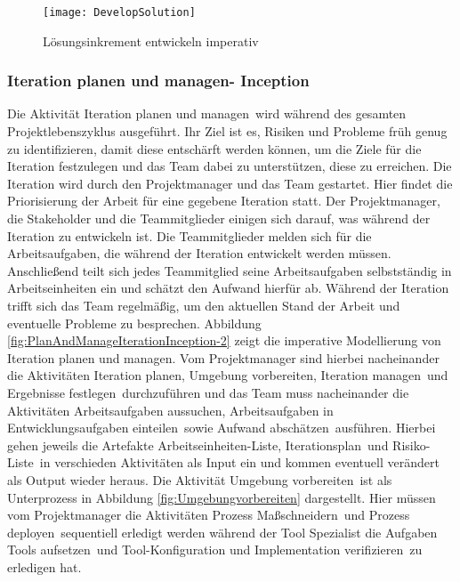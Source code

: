  
\begin{figure}[htp]
\begin{center}
  \texttt{[image: DevelopSolution]} %
  \caption{Lösungsinkrement entwickeln imperativ}
  \label{fig:Dev}
\end{center}
\end{figure}

\subsubsection{Iteration planen und managen- Inception}

Die Aktivität \grqq Iteration planen und managen\grqq \ wird während des gesamten Projektlebenszyklus ausgeführt. Ihr Ziel ist es, Risiken und Probleme früh genug zu identifizieren, damit diese entschärft werden können, um die Ziele für die Iteration festzulegen und das Team dabei zu unterstützen, diese zu erreichen.
Die Iteration wird durch den Projektmanager und das Team gestartet. Hier findet die Priorisierung der Arbeit für eine gegebene Iteration statt. Der Projektmanager, die Stakeholder und die Teammitglieder einigen sich darauf, was während der Iteration zu entwickeln ist.
Die Teammitglieder melden sich für die Arbeitsaufgaben, die während der Iteration entwickelt werden müssen. Anschließend teilt sich jedes Teammitglied seine Arbeitsaufgaben selbstständig in Arbeitseinheiten ein und schätzt den Aufwand hierfür ab.\newline
Während der Iteration trifft sich das Team regelmäßig, um den aktuellen Stand der Arbeit und eventuelle Probleme zu besprechen. \newline
Abbildung \ref{fig:PlanAndManageIterationInception-2} zeigt die imperative Modellierung von \grqq Iteration planen und managen\grqq. 
Vom Projektmanager sind hierbei nacheinander die Aktivitäten \grqq Iteration planen, Umgebung vorbereiten, Iteration managen\grqq \ und \grqq Ergebnisse festlegen\grqq \ durchzuführen und das Team muss nacheinander die Aktivitäten \grqq Arbeitsaufgaben aussuchen, Arbeitsaufgaben in Entwicklungsaufgaben einteilen\grqq \ sowie \grqq Aufwand abschätzen\grqq \ ausführen. Hierbei gehen jeweils die Artefakte \grqq Arbeitseinheiten-Liste, Iterationsplan\grqq \ und \grqq Risiko-Liste\grqq \ in verschieden Aktivitäten als Input ein und kommen eventuell verändert als Output wieder heraus. \newline
Die Aktivität \grqq Umgebung vorbereiten\grqq \ ist als Unterprozess in Abbildung \ref{fig:Umgebungvorbereiten} dargestellt. Hier müssen vom Projektmanager die Aktivitäten \grqq Prozess Maßschneidern\grqq \ und \grqq Prozess deployen\grqq \ sequentiell erledigt werden während der Tool Spezialist die Aufgaben \grqq Tools aufsetzen\grqq \ und \grqq Tool-Konfiguration und Implementation verifizieren\grqq \ zu erledigen hat.


